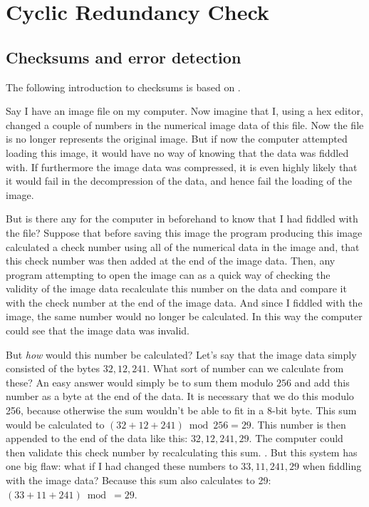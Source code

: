 \begin{comment}
  
\end{comment}

\chapter{Cyclic Redundancy Check}
\label{cha:crc}

\section{Checksums and error detection}

The following introduction to checksums is based on
\cite{Williams_1993_crc_painless,barr:_addit_check,tanenbaum2003computernetworks_crc,Nelson:1992:FVU:135011.135017_crc32}.

Say I have an image file on my computer. Now imagine that I, using a
hex editor, changed a couple of numbers in the numerical image data of
this file. Now the file is no longer represents the original
image. But if now the computer attempted loading this image, it would
have no way of knowing that the data was fiddled with. If furthermore
the image data was compressed, it is even highly likely that it would
fail in the decompression of the data, and hence fail the loading of
the image.

But is there any for the computer in beforehand to know that I had
fiddled with the file? Suppose that before saving this image the
program producing this image calculated a check number using all of
the numerical data in the image and, that this check number was then
added at the end of the image data. Then, any program attempting to
open the image can as a quick way of checking the validity of the
image data recalculate this number on the data and compare it with the
check number at the end of the image data. And since I fiddled with
the image, the same number would no longer be calculated. In this way
the computer could see that the image data was invalid.

But \textit{how} would this number be calculated? Let's say that the
image data simply consisted of the bytes $32,12,241$. What sort of
number can we calculate from these? An easy answer would simply be to
sum them modulo $256$ and add this number as a byte at the end of the
data. It is necessary that we do this modulo 256, because otherwise
the sum wouldn't be able to fit in a 8-bit byte. This sum would be
calculated to $(32 + 12 + 241) \bmod 256 = 29$. This number is then
appended to the end of the data like this: $32,12,241,29$. The
computer could then validate this check number by recalculating this
sum. . But this system has one big flaw: what if I had changed these
numbers to $33,11,241, 29$ when fiddling with the image data?  Because
this sum also calculates to 29: $(33 + 11 + 241) \bmod = 29$.

